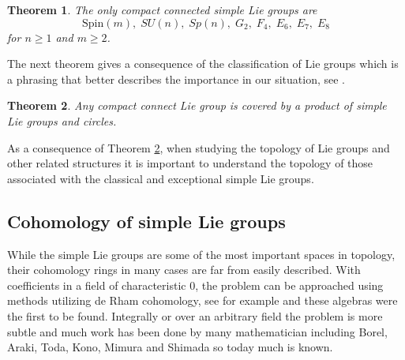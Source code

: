 \documentclass{article}
\theoremstyle{plain}
\newtheorem{thm}{Theorem}[section]
\theoremstyle{definition}
\numberwithin{thm}{section}
\begin{document}
		\begin{thm}
				The only compact connected simple Lie groups are
				\begin{equation*}
					\mathrm{Spin}(m),\; SU(n),\; Sp(n),\; G_2,\; F_4,\; E_6,\; E_7,\; E_8
				\end{equation*}
				for $n\geq 1$ and $m \geq 2$.
		\end{thm}
		
		The next theorem gives a consequence of the classification of Lie groups which is a phrasing that better describes the importance in our situation,
		see \cite{Onishchik}.
		
		\begin{thm}\label{LieClassifiaction}
			Any compact connect Lie group is covered by a product of simple Lie groups and circles.
		\end{thm}

		As a consequence of Theorem \ref{LieClassifiaction}, when studying the topology of Lie groups and other related structures it is important to understand
		the topology of those associated with the classical and exceptional simple Lie groups.
		

	\subsection{Cohomology of simple Lie groups}\label{sec:SimpleLie}
		
		While the simple Lie groups are some of the most important spaces in topology, their cohomology rings in many cases are far from easily described.
		With coefficients in a field of characteristic $0$, the problem can be approached using methods utilizing de Rham cohomology, see for example \cite{RealCoHomogeneous}
		and these algebras were the first to be found.
		Integrally or over an arbitrary field the problem is more subtle and much work has been done by many mathematician including 
		Borel, Araki, Toda, Kono, Mimura and Shimada so today much is known.
		
\end{document}
